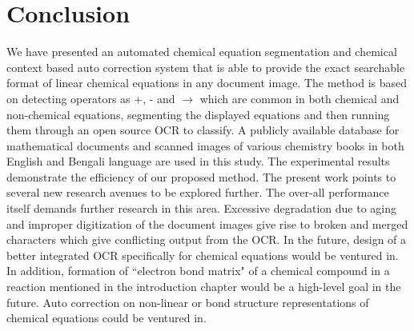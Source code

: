 \documentclass[oneside,a4paper,12pt]{book}
\begin{document}
\chapter{Conclusion}
\label{sc_conclu}
We have presented an automated chemical equation segmentation and chemical context based auto correction system that is able to provide the exact searchable format of linear chemical equations in any document image.  
The method is based on detecting operators as +, - and $ \rightarrow$ which are common in both chemical and non-chemical equations,
segmenting the displayed equations and then running them through an open source OCR to classify.
A publicly available database for mathematical documents and scanned images of various chemistry 
books in  both English and Bengali language are used in this study. 
The experimental results demonstrate the efficiency of our proposed method. 
The present work points to several new research avenues to be explored further. 
The over-all performance itself demands further research in this area. Excessive degradation due to aging and
improper digitization of the document images give rise to broken and merged characters which give conflicting output
from the OCR. In the future, design of a better integrated OCR specifically for
chemical equations would be ventured in.
In addition, formation of  ``electron bond matrix"  of a chemical compound in a reaction mentioned in 
the introduction chapter would be a high-level goal in the future.
Auto correction on non-linear or bond structure representations of chemical equations could be ventured in.
\end{document}
